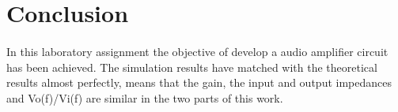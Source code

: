 \section{Conclusion}
\label{sec:conclusion}

\paragraph{} In this laboratory assignment the objective of develop a audio amplifier circuit has been
achieved. The simulation results have matched with the theoretical results almost perfectly, means that the gain,
the input and output impedances and Vo(f)/Vi(f) are similar in the two parts of this work.




